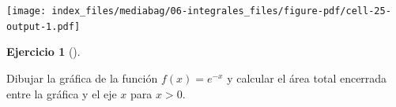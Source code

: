 \documentclass[
  a4paper,
]{scrreport}
\newenvironment{Shaded}{\begin{snugshade}}{\end{snugshade}}
\newcommand{\BuiltInTok}[1]{\textcolor[rgb]{0.00,0.23,0.31}{#1}}
\newcommand{\FloatTok}[1]{\textcolor[rgb]{0.68,0.00,0.00}{#1}}
\newcommand{\FunctionTok}[1]{\textcolor[rgb]{0.28,0.35,0.67}{#1}}
\newcommand{\ImportTok}[1]{\textcolor[rgb]{0.00,0.46,0.62}{#1}}
\newcommand{\NormalTok}[1]{\textcolor[rgb]{0.00,0.23,0.31}{#1}}
\newcommand{\OperatorTok}[1]{\textcolor[rgb]{0.37,0.37,0.37}{#1}}
\newcommand{\SpecialCharTok}[1]{\textcolor[rgb]{0.37,0.37,0.37}{#1}}
\newcommand{\StringTok}[1]{\textcolor[rgb]{0.13,0.47,0.30}{#1}}
\theoremstyle{definition}
\newtheorem{exercise}{Ejercicio}[chapter]
\theoremstyle{remark}
\begin{document}
\begin{tcolorbox}
\begin{Shaded}
\end{Shaded}

\texttt{[image: index\_files/mediabag/06-integrales\_files/figure-pdf/cell-25-output-1.pdf]}

\end{tcolorbox}

\begin{exercise}[]\protect\hypertarget{exr-integral-impropia}{}\label{exr-integral-impropia}

Dibujar la gráfica de la función \(f(x)=e^{-x}\) y calcular el área
total encerrada entre la gráfica y el eje \(x\) para \(x>0\).

\end{exercise}
\end{document}

